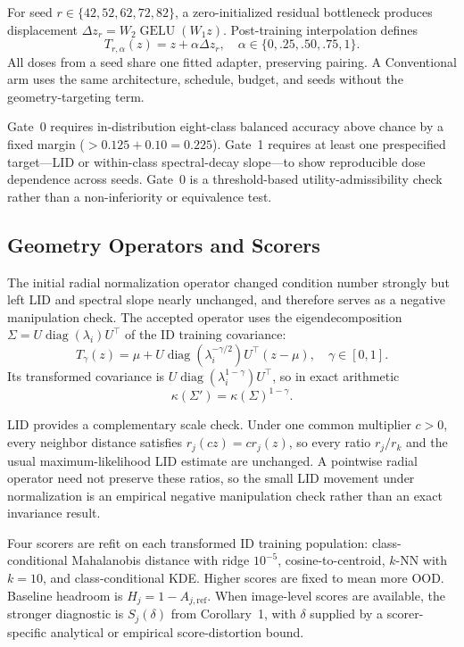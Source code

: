 \documentclass[pdflatex,sn-basic]{sn-jnl}
\theoremstyle{plain}
\theoremstyle{definition}
\theoremstyle{remark}
\begin{document}
For seed $r\in\{42,52,62,72,82\}$, a zero-initialized residual bottleneck produces displacement $\Delta z_r=W_2\operatorname{GELU}(W_1z)$. Post-training interpolation defines
\begin{equation}
T_{r,\alpha}(z)=z+\alpha\Delta z_r,\quad
\alpha\in\{0,.25,.50,.75,1\}.
\end{equation}
All doses from a seed share one fitted adapter, preserving pairing. A Conventional arm uses the same architecture, schedule, budget, and seeds without the geometry-targeting term.

Gate~0 requires in-distribution eight-class balanced accuracy above chance by a fixed margin ($>0.125+0.10=0.225$). Gate~1 requires at least one prespecified target---LID or within-class spectral-decay slope---to show reproducible dose dependence across seeds. Gate~0 is a threshold-based utility-admissibility check rather than a non-inferiority or equivalence test.

\subsection{Geometry Operators and Scorers}
The initial radial normalization operator changed condition number strongly but left LID and spectral slope nearly unchanged, and therefore serves as a negative manipulation check. The accepted operator uses the eigendecomposition $\Sigma=U\operatorname{diag}(\lambda_i)U^\top$ of the ID training covariance:
\begin{equation}
T_\gamma(z)=\mu+U\operatorname{diag}(\lambda_i^{-\gamma/2})U^\top(z-\mu),
\quad \gamma\in[0,1].
\end{equation}
Its transformed covariance is $U\operatorname{diag}(\lambda_i^{1-\gamma})U^\top$, so in exact arithmetic
\begin{equation}
\kappa(\Sigma')=\kappa(\Sigma)^{1-\gamma}.
\end{equation}

LID provides a complementary scale check. Under one common multiplier $c>0$, every neighbor distance satisfies $r_j(cz)=cr_j(z)$, so every ratio $r_j/r_k$ and the usual maximum-likelihood LID estimate are unchanged. A pointwise radial operator need not preserve these ratios, so the small LID movement under normalization is an empirical negative manipulation check rather than an exact invariance result.

Four scorers are refit on each transformed ID training population: class-conditional Mahalanobis distance with ridge $10^{-5}$, cosine-to-centroid, $k$-NN with $k=10$, and class-conditional KDE. Higher scores are fixed to mean more OOD. Baseline headroom is $H_j=1-A_{j,\mathrm{ref}}$. When image-level scores are available, the stronger diagnostic is $S_j(\delta)$ from Corollary~1, with $\delta$ supplied by a scorer-specific analytical or empirical score-distortion bound.
\end{document}
